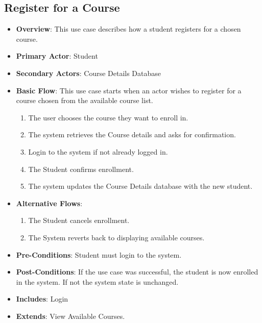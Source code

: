 \documentclass[12pt, a4]{article}
\begin{document}
\subsection{Register for a Course}
\begin{itemize}
    \item \textbf{Overview}: This use case describes how a student registers for a chosen course.
    \item \textbf{Primary Actor}: Student
    \item \textbf{Secondary Actors}: Course Details Database
    \item \textbf{Basic Flow}: This use case starts when an actor wishes to register for a course chosen from the available course list.
        \begin{enumerate}
            \item The user chooses the course they want to enroll in.
            \item The system retrieves the Course details and asks for confirmation.
            \item Login to the system if not already logged in.
            \item The Student confirms enrollment.
            \item The system updates the Course Details database with the new student.
        \end{enumerate}
    \item \textbf{Alternative Flows}:
        \begin{enumerate}
            \item The Student cancels enrollment.
            \item The System reverts back to displaying available courses.
        \end{enumerate}
    \item \textbf{Pre-Conditions}: Student must login to the system.
    \item \textbf{Post-Conditions}: If the use case was successful, the student is now enrolled in the system. If not the system state is unchanged.
    \item \textbf{Includes}: Login
    \item \textbf{Extends}: View Available Courses.
\end{itemize}

\end{document}
